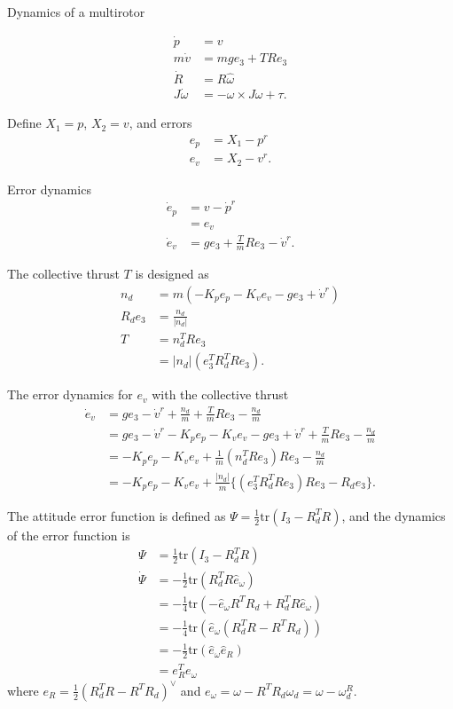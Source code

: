 \documentclass{article}
\begin{document}
Dynamics of a multirotor

\begin{align}
\dot{p} &= v \nonumber \\
m\dot{v} &= mge_3 + TRe_3 \nonumber \\
\dot{R} &= R\hat{\omega} \nonumber \\
J\dot{\omega} &= -\omega \times J\omega + \tau. \nonumber 
\end{align}

Define $X_1 = p$, $X_2 = v$, and errors
\begin{align}
e_p &= X_1 - p^r \nonumber \\
e_v &= X_2 - v^r. \nonumber
\end{align}

Error dynamics
\begin{align}
\dot{e}_p &= v - \dot{p}^r \nonumber \\
&= e_v \nonumber \\
\dot{e}_v &= ge_3 + \frac{T}{m}Re_3 - \dot{v}^r. \nonumber 
\end{align}

The collective thrust $T$ is designed as
\begin{align}
n_d &= m(-K_pe_p - K_ve_v -ge_3 + \dot{v}^r) \nonumber \\
R_de_3 &= \frac{n_d}{|n_d|}  \nonumber \\
T &= n_d^TRe_3 \nonumber \\
&= |n_d| (e_3^TR_d^TRe_3). \nonumber
\end{align}

The error dynamics for $e_v$ with the collective thrust
\begin{align}
\dot{e}_v &= ge_3 - \dot{v}^r + \frac{n_d}{m} +\frac{T}{m}Re_3 - \frac{n_d}{m}\nonumber \\
 &= ge_3 - \dot{v}^r  - K_pe_p - K_ve_v -ge_3 + \dot{v}^r +\frac{T}{m}Re_3 - \frac{n_d}{m} \nonumber  \\
&= -K_pe_p -K_ve_v  + \frac{1}{m}(n_d^TRe_3)Re_3 -\frac{n_d}{m} \nonumber \\
&= -K_pe_p-K_ve_v + \frac{|n_d|}{m}\{(e_3^TR_d^TRe_3)Re_3 - R_de_3\}. \nonumber
\end{align}

The attitude error function is defined as $\Psi = \frac{1}{2}\text{tr}(I_3 - R_d^TR)$, and the dynamics of the error function is 
\begin{align}
\Psi &= \frac{1}{2}\text{tr}(I_3 - R_d^TR) \nonumber \\
\dot{\Psi} &=  -\frac{1}{2}\text{tr}(R_d^TR\hat{e}_\omega) \nonumber \\
&=  -\frac{1}{4}\text{tr}(-\hat{e}_\omega R^T R_d + R_d^T R \hat{e}_\omega) \nonumber \\
&= -\frac{1}{4}\text{tr}(\hat{e}_\omega(R_d^TR - R^TR_d)) \nonumber \\
&= -\frac{1}{2}\text{tr}(\hat{e}_\omega \hat{e}_R) \nonumber \\
&= e_R^Te_\omega \nonumber 
\end{align}
where $e_R = \frac{1}{2} (R_d^T R-R^T R_d) ^\vee$ and $e_\omega = \omega - R^TR_d\omega_d = \omega - \omega_d^R$.
\end{document}
